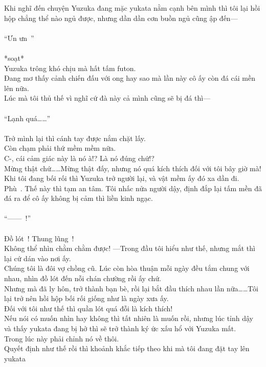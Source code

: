 \documentclass[12pt,a4paper, twosides]{book}
\begin{document}
Khi nghĩ đến chuyện Yuzuka đang mặc yukata nằm cạnh bên mình thì tôi lại hồi hộp chẳng thể nào ngủ được, nhưng dần dần cơn buồn ngủ cũng ập đến—\\
\\
“Ưn ưn~”\\
\\
*soạt*\\
Yuzuka trông khó chịu mà hất tấm futon.\\
Đang mơ thấy cảnh chiến đấu với ong hay sao mà lần này cô ấy còn đá cái mền lên nữa.\\
Lúc mà tôi thủ thế vì nghĩ cứ đà này cả mình cũng sẽ bị đá thì—\\
\\
“Lạnh quá……”\\
\\
Trở mình lại thì cánh tay được nắm chặt lấy.\\
Còn chạm phải thứ mềm mềm nữa.\\
C-, cái cảm giác này là nó à!? Là nó đúng chứ!?\\
Mừng thật chứ……Mừng thật đấy, nhưng nó quá kích thích đối với tôi bây giờ mà!\\
Khi tôi đang bối rối thì Yuzuka trở người lại, và vật mềm ấy đó xa dần đi.\\
Phù~. Thế này thì tạm an tâm. Tôi nhấc nửa người dậy, định đắp lại tấm mền đã đá ra để cô ấy không bị cảm thì liền kinh ngạc.\\
\\
“——~!”\\
\\
Đồ lót~! Thung lũng~!\\
Không thể nhìn chằm chằm được! —Trong đầu tôi hiểu như thế, nhưng mắt thì lại cứ dán vào nơi ấy.\\
Chúng tôi là đôi vợ chồng cũ. Lúc còn hòa thuận mỗi ngày đều tắm chung với nhau, nhìn đồ lót đến nỗi chán chường rồi ấy chứ.\\
Nhưng mà đã ly hôn, trở thành bạn bè, rồi lại bắt đầu thích nhau lần nữa……Tôi lại trở nên hồi hộp bối rối giống như là ngày xưa ấy.\\
Đối với tôi như thế thì quần lót quá đỗi là kích thích!\\
Nếu nói có muốn nhìn hay không thì tất nhiên là muốn rồi, nhưng lúc tỉnh dậy và thấy yukata đang bị hở thì sẽ trở thành ký ức xấu hổ với Yuzuka mất.\\
Trong lúc này phải chỉnh nó về thôi.\\
Quyết định như thế rồi thì khoảnh khắc tiếp theo khi mà tôi đang đặt tay lên yukata\\
\end{document}
